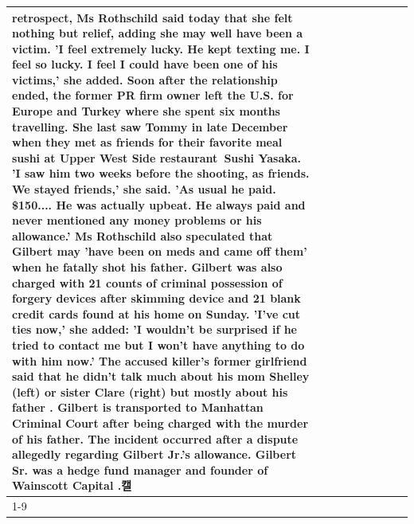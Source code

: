 \begin{table}[H]
\begin{tabular}{lllrlllll}
retrospect, Ms Rothschild said today that she felt nothing but relief, adding she may well have been a victim. 'I feel extremely lucky. He kept texting me. I feel so lucky. I feel I could have been one of his victims,' she added. Soon after the relationship ended, the former PR firm owner left the U.S. for Europe and Turkey where she spent six months  travelling. She last saw Tommy in late December when they met as friends for their favorite meal sushi at Upper West Side restaurant Sushi Yasaka. 'I saw him two weeks before the shooting, as friends. We stayed friends,' she said. 'As usual he paid. \$150.... He was actually upbeat. He always paid and never mentioned any money problems or his allowance.' Ms Rothschild also speculated that Gilbert may 'have been on meds and came off them' when he fatally shot his father. Gilbert was also charged with 21 counts of criminal possession of forgery devices after skimming device and 21 blank credit cards found at his home on Sunday. 'I've cut ties now,' she added: 'I wouldn’t be surprised if he tried to contact me but I won’t have anything to do with him now.' The accused killer's former girlfriend said that he didn't talk much about his mom Shelley (left) or sister Clare (right) but mostly about his father . Gilbert is transported to Manhattan Criminal Court  after being charged with the murder of his father. The incident occurred after a dispute allegedly regarding Gilbert Jr.'s allowance. Gilbert Sr. was a hedge fund manager and founder of Wainscott Capital .캘 \\
\cline{1-9} \cline{2-9}

\end{tabular}
\end{table}
